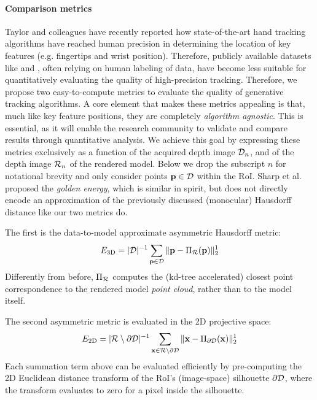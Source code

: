 
\paragraph{Comparison metrics}
Taylor and colleagues  have recently reported how state-of-the-art hand tracking algorithms have reached human precision in determining the location of key features (e.g. fingertips and wrist position). Therefore, publicly available datasets like \cite{tompson2014real} and \cite{sridhar2013multicam}, often relying on human labeling of data, have become less suitable for quantitatively evaluating the quality of high-precision tracking. 
% 
Therefore, we propose two easy-to-compute metrics to evaluate the quality of generative tracking algorithms. A core element that makes these metrics appealing is that, much like key feature positions, they are completely \emph{algorithm agnostic}. This is essential, as it will enable the research community to validate and compare results through quantitative analysis. 
% 
We achieve this goal by expressing these metrics exclusively as a function of the acquired depth image $\mathcal{D}_n$, and of the depth image $\mathcal{R}_{n}$ of the rendered model. Below we drop the subscript $n$ for notational brevity and only consider points  $\mathbf{p} \in \mathcal{D}$ within the RoI.  Sharp et al.~ proposed the \emph{golden energy}, which is similar in spirit, but does not directly encode an approximation of the previously discussed (monocular) Hausdorff distance like our two metrics do. 

The first is the data-to-model approximate asymmetric Hausdorff metric: 
% 
\begin{equation}
E_\text{3D} = |\mathcal{D}|^{-1} \sum_{\mathbf{p} \in \mathcal{D}} \| \mathbf{p} - \Pi_{\mathcal{R}}(\mathbf{p}) \|_2^1
\label{eq:metric1}
\end{equation}
% 
Differently from before, $\Pi_{\mathcal{R}}$ computes the (kd-tree accelerated) closest point correspondence to the rendered model \emph{point cloud}, rather than to the model itself. 

\newpage
The second asymmetric metric is evaluated in the 2D projective space:
% 
\begin{eqnarray}
E_\text{2D} = |\mathcal{R} \setminus \partial\mathcal{D}|^{-1} 
\sum_{\mathbf{x} \in \mathcal{R} \setminus \partial\mathcal{D}} \| \mathbf{x} - \Pi_{\partial\mathcal{D}}(\mathbf{x}) \|^1_2
\label{eq:metric2}
\end{eqnarray}
% 
Each summation term above can be evaluated efficiently by pre-computing the 2D Euclidean distance transform of the RoI's (image-space) silhouette $\partial \mathcal{D}$, where the transform evaluates to zero for a pixel inside the silhouette.

